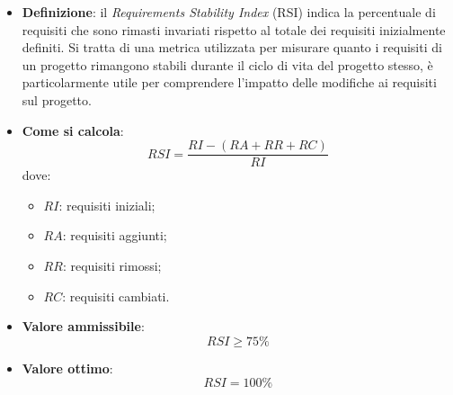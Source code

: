 \hypertarget{33M}{}
\begin{itemize}
	\item \textbf{Definizione}: il \textit{Requirements Stability Index} (RSI) indica la percentuale di requisiti che sono rimasti invariati rispetto al totale dei requisiti inizialmente definiti. Si tratta di una metrica utilizzata per misurare quanto i requisiti di un progetto rimangono stabili durante il ciclo di vita del progetto stesso, è particolarmente utile per comprendere l'impatto delle modifiche ai requisiti sul progetto.
	\item \textbf{Come si calcola}: \begin{equation*}RSI = \frac{RI - (RA + RR + RC)}{RI}\end{equation*} dove:
		\begin{itemize}
			\item $RI$: requisiti iniziali;
			\item $RA$: requisiti aggiunti;
			\item $RR$: requisiti rimossi;
			\item $RC$: requisiti cambiati.
		\end{itemize}
	\item \textbf{Valore ammissibile}: \begin{equation*}RSI \geq 75\%\end{equation*}
	\item \textbf{Valore ottimo}: \begin{equation*}RSI = 100\%\end{equation*}
\end{itemize}

